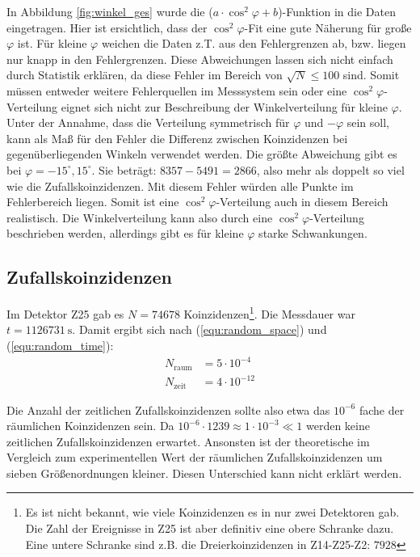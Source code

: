 In Abbildung \ref{fig:winkel_ges} wurde die ($a \cdot \cos^2{\varphi} + b$)-Funktion in die Daten eingetragen. Hier ist ersichtlich, dass der  $\cos^2{\varphi}$-Fit eine gute Näherung für große $\varphi$ ist. Für kleine $\varphi$ weichen die Daten z.T. aus den Fehlergrenzen ab, bzw. liegen nur knapp in den Fehlergrenzen. Diese Abweichungen lassen sich nicht einfach durch Statistik erklären, da diese Fehler im Bereich von $\sqrt{N} \leq 100$ sind. Somit müssen entweder weitere Fehlerquellen im Messsystem sein oder eine $\cos^2{\varphi}$-Verteilung eignet sich nicht zur Beschreibung der Winkelverteilung für kleine $\varphi$.\\

Unter der Annahme, dass die Verteilung symmetrisch für $\varphi$ und $-\varphi$ sein soll, kann als Maß für den Fehler die Differenz zwischen Koinzidenzen bei gegenüberliegenden Winkeln verwendet werden. Die größte Abweichung gibt es bei $\varphi = -15^\circ,15^\circ$. Sie beträgt: $8357
 - 5491 = 2866$, also mehr als doppelt so viel wie die Zufallskoinzidenzen. Mit diesem Fehler würden alle Punkte im Fehlerbereich liegen. Somit ist eine $\cos^2{\varphi}$-Verteilung auch in diesem Bereich realistisch. Die Winkelverteilung kann also durch eine $\cos^2{\varphi}$-Verteilung beschrieben werden, allerdings gibt es für kleine $\varphi$ starke Schwankungen.\\
 
\subsection{Zufallskoinzidenzen}
Im Detektor Z25 gab es $N = 74678$ Koinzidenzen\footnote{Es ist nicht bekannt, wie viele Koinzidenzen es in nur zwei Detektoren gab. Die Zahl der Ereignisse in Z25 ist aber definitiv eine obere Schranke dazu. Eine untere Schranke sind z.B. die Dreierkoinzidenzen in Z14-Z25-Z2: $7928$}. Die Messdauer war $t = \SI{1126731}{\second}$. Damit ergibt sich nach (\ref{equ:random_space}) und (\ref{equ:random_time}):\\
\begin{align*}
N_{\text{raum}} &= 5 \cdot 10^{-4}\\
N_{\text{zeit}} &= 4 \cdot 10^{-12}
\end{align*}

Die Anzahl der zeitlichen Zufallskoinzidenzen sollte also etwa das $10^{-6}$ fache der räumlichen Koinzidenzen sein. Da $10^{-6} \cdot 1239 \approx 1 \cdot 10^{-3} \ll 1$ werden keine zeitlichen Zufallskoinzidenzen erwartet. Ansonsten ist der theoretische im Vergleich zum experimentellen Wert der räumlichen Zufallskoinzidenzen um sieben Größenordnungen kleiner. Diesen Unterschied kann nicht erklärt werden.  
 
